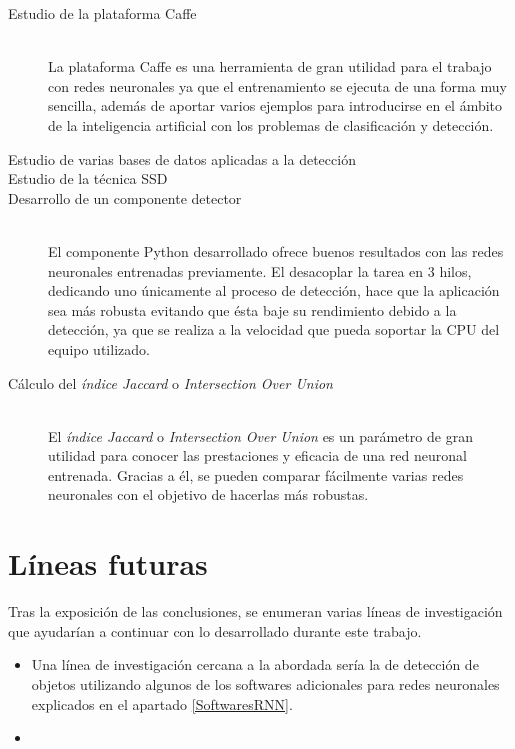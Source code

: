\documentclass[a4paper, 12pt, spanish, chapterprefix, numbers=noenddot]{book}
\begin{document}
\begin{description}
\item[Estudio de la plataforma Caffe]\hfill 
\vspace{5pt}
\\
La plataforma Caffe es una herramienta de gran utilidad para el trabajo con redes neuronales ya que el entrenamiento se ejecuta de una forma muy sencilla, además de aportar varios ejemplos para introducirse en el ámbito de la inteligencia artificial con los problemas de clasificación y detección. 
\item[Estudio de varias bases de datos aplicadas a la detección]
\item[Estudio de la técnica SSD]
\item[Desarrollo de un componente detector]\hfill 
\vspace{5pt}
\\
El componente Python desarrollado ofrece buenos resultados con las redes neuronales entrenadas previamente. El desacoplar la tarea en 3 hilos, dedicando uno únicamente al proceso de detección, hace que la aplicación sea más robusta evitando que ésta baje su rendimiento debido a la detección, ya que se realiza a la velocidad que pueda soportar la CPU del equipo utilizado.
\item[Cálculo del \textit{índice Jaccard} o \textit{Intersection Over Union}]\hfill 
\vspace{5pt}
\\
El \textit{índice Jaccard} o \textit{Intersection Over Union} es un parámetro de gran utilidad para conocer las prestaciones y eficacia de una red neuronal entrenada. Gracias a él, se pueden comparar fácilmente varias redes neuronales con el objetivo de hacerlas más robustas.
\end{description}

\section{Líneas futuras}

Tras la exposición de las conclusiones, se enumeran varias líneas de investigación que ayudarían a continuar con lo desarrollado durante este trabajo.

\begin{itemize}
\item Una línea de investigación cercana a la abordada sería la de detección de objetos utilizando algunos de los softwares adicionales para redes neuronales explicados en el apartado \ref{SoftwaresRNN}.
\item
\end{itemize}
\end{document}
